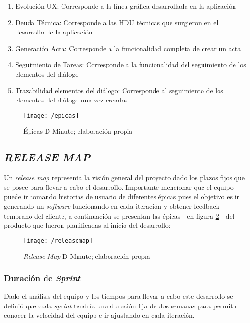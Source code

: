 \begin{enumerate}[1.]
   \item Evolución UX: Corresponde a la línea gráfica desarrollada en la aplicación
   \item Deuda Técnica: Corresponde a las HDU técnicas que surgieron en el desarrollo de la aplicación
   \item Generación Acta: Corresponde a la funcionalidad completa de crear un acta
   \item Seguimiento de Tareas: Corresponde a la funcionalidad del seguimiento de los elementos del diálogo
   \item Trazabilidad elementos del diálogo: Corresponde al seguimiento de los elementos del diálogo una vez creados
\end{enumerate}

\begin{figure}[!h]
\centering
\texttt{[image: /epicas]}
\caption{Épicas D-Minute; elaboración propia} 
\label{img4-4}
\end{figure}

\subsection{\textit{RELEASE MAP}}

Un \textit{release map} representa la visión general del proyecto dado los plazos fijos que se posee para llevar a cabo el desarrollo. Importante mencionar que el equipo puede ir tomando historias de usuario de diferentes épicas pues el objetivo es ir generando un \textit{software} funcionando en cada iteración y obtener feedback temprano del cliente, a continuación se presentan las épicas - en figura \ref{img4-5} - del producto que fueron planificadas al inicio del desarrollo:

\begin{figure}[!h]
\centering
\texttt{[image: /releasemap]}
\caption{\textit{Release Map} D-Minute; elaboración propia} 
\label{img4-5}
\end{figure}

\subsubsection{Duración de \textit{Sprint}}

Dado el análisis del equipo y los tiempos para llevar a cabo este desarrollo se definió que cada \textit{sprint} tendría una duración fija de dos semanas para permitir conocer la velocidad del equipo e ir ajustando en cada iteración. 	

